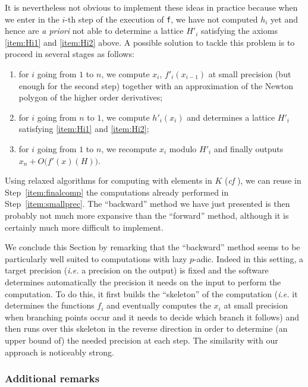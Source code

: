 \documentclass{lms}
\begin{document}
It is nevertheless not obvious to implement these ideas in practice
because when we enter in the $i$-th step of the execution of {\tt f},
we have not computed $h_i$ yet and hence are \emph{a priori} not able
to determine a lattice $H'_i$ satisfying the axioms \eqref{item:Hi1}
and \eqref{item:Hi2} above.
A possible solution to tackle this problem is to proceed in several
stages as follows: 
\begin{enumerate}[(1)]
\item \label{item:smallprec}
for $i$ going from $1$ to $n$, we compute $x_i$, $f'_i(x_{i-1})$ 
at small precision (but enough for the second step) together with an
approximation of the Newton polygon of the higher order derivatives;
\item \label{item:determineHi}
for $i$ going from $n$ to $1$, we compute $h'_i(x_i)$ and
determines a lattice $H'_i$ satisfying \eqref{item:Hi1} and 
\eqref{item:Hi2};
\item \label{item:finalcomp}
for $i$ going from $1$ to $n$, we recompute $x_i$ modulo $H'_i$
and finally outputs $x_n + O\big(f'(x)(H)\big)$.
\end{enumerate}
Using relaxed algorithms for computing with elements in $K$ (\emph{cf} 
\cite{}), we can reuse in Step~\eqref{item:finalcomp} the computations 
already performed in Step~\eqref{item:smallprec}. The ``backward'' method 
we have just presented is then probably not much more expansive than the 
``forward'' method, although it is certainly much more difficult to 
implement. 

We conclude this Section by remarking that the ``backward'' method seems 
to be particularly well suited to computations with lazy $p$-adic. Indeed 
in this setting, a target precision (\emph{i.e.} a precision on the 
output) is fixed and the software determines automatically the precision 
it needs on the input to perform the computation. To do this, it first 
builds the ``skeleton'' of the computation (\emph{i.e.} it determines the 
functions $f_i$ and eventually computes the $x_i$ at small precision when 
branching points occur and it needs to decide which branch it follows) 
and then runs over this skeleton in the reverse direction in order to 
determine (an upper bound of) the needed precision at each step. The 
similarity with our approach is noticeably strong.

\subsubsection*{Additional remarks}
\end{document}
